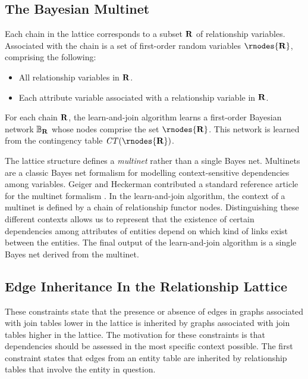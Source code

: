 \subsection{The Bayesian Multinet}

Each chain in the lattice corresponds to a subset $\mathbf{R}$ of relationship variables. Associated with the chain is a set of first-order random variables $\rnodes{\set{\Relation}}$, comprising the following:

\begin{itemize}
\item All relationship variables in $\mathbf{R}$. 
\item Each attribute variable associated with a relationship variable in $\mathbf{R}$.
\end{itemize}

For each chain $\mathbf{R}$, the learn-and-join algorithm learns a first-order Bayesian network 
$\mathbb{B}_{\mathbf{R}}$ whose nodes comprise the set $\rnodes{\set{\Relation}}$. This network is learned from the contingency table $\cttable(\rnodes{\set{\Relation}})$.

The lattice structure defines a {\em multinet} rather than a single Bayes net. Multinets are a classic Bayes net formalism for modelling context-sensitive dependencies among variables. 
Geiger and Heckerman contributed a standard reference article for the multinet formalism  \cite{Geiger1996}.  
%
In the learn-and-join algorithm, the context of a multinet is defined by a chain of relationship functor nodes. Distinguishing these different contexts allows us to  represent that the existence of certain dependencies among attributes of entities depend on which kind of links exist between the entities. The final output of the learn-and-join algorithm is a single Bayes net derived from the multinet.

\subsection{Edge Inheritance In the Relationship Lattice}
These constraints state that the presence or absence of edges in graphs associated with join tables lower in the lattice is inherited by graphs associated with join tables higher in the lattice. The motivation for these constraints is that dependencies should be assessed in the most specific context possible. The first constraint states that edges from an entity table are inherited by relationship tables that involve the entity in question.

